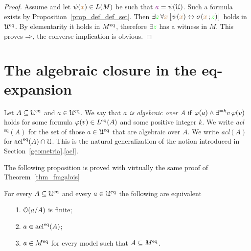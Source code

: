 \documentclass[creche.tex]{subfiles}
\begin{document}
\begin{proof}
Assume  and let $\psi({\color{brown} x})\in L(M)$ be such that ${\color{violet} a}=\psi(\EuScript U)$. Such a formula exists by Proposition~\ref{prop_def_def_set}. Then $\exists{\color{green}z}\,\forall{\color{brown}x}\,\big[\psi({\color{brown} x})\leftrightarrow\sigma({\color{brown} x}\,;{\color{green} z})\big]$ holds in $\EuScript U^{{\rm eq}}$. By elementarity it holds in $M^{{\rm eq}}$, therefore $\exists{\color{green}z}$ has a witness in $M$. This proves $\Rightarrow$, the converse implication is obvious.
\end{proof}

\section{The algebraic closure in the eq-expansion}


Let $A\subseteq\EuScript U^{{\rm eq}}$ and $a\in\EuScript U^{{\rm eq}}$. We say that \emph{$a$ is algebraic over $A$\/} if $\varphi(a)\wedge\exists^{=k}v\,\varphi(v)$ holds for some formula $\varphi(v)\in L^{{\rm eq}}(A)$ and some positive integer $k$. We write \emph{acl$^\textrm{eq}(A)$\/} for the set of those $a\in\EuScript U^{{\rm eq}}$ that are algebraic over $A$. We write \emph{acl$(A)$\/} for $\mathop{\rm acl}^{{\rm eq}}(A)\cap\EuScript U$. This is the natural generalization of the notion introduced in Section~\ref{geometria}.\ref{acl}.


The following proposition is proved with virtually the same proof of Theorem~\ref{thm_fmgalois}

\begin{theorem}\label{thm_Galois_alg=alg}
For every $A\subseteq\EuScript U^{{\rm eq}}$ and every $a\in\EuScript U^{{\rm eq}}$ the following are equivalent
\begin{itemize}
\item[1.] $\EuScript O(a/A)$ is finite;
\item[2.] $a\in\mathop{\rm acl}^{{\rm eq}}(A)$;
\item[3.] $a\in M^{{\rm eq}}$ for every model such that $A\subseteq M^{{\rm eq}}$.\QED
\end{itemize}
\end{theorem}
\end{document}
